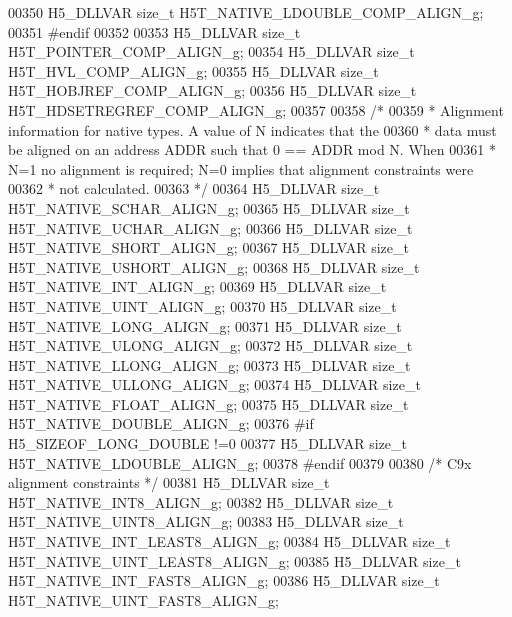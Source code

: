 \begin{DoxyCode}
00350 H5\_DLLVAR \textcolor{keywordtype}{size\_t}    H5T\_NATIVE\_LDOUBLE\_COMP\_ALIGN\_g;
00351 \textcolor{preprocessor}{#endif}
00352 
00353 H5\_DLLVAR \textcolor{keywordtype}{size\_t} H5T\_POINTER\_COMP\_ALIGN\_g;
00354 H5\_DLLVAR \textcolor{keywordtype}{size\_t} H5T\_HVL\_COMP\_ALIGN\_g;
00355 H5\_DLLVAR \textcolor{keywordtype}{size\_t} H5T\_HOBJREF\_COMP\_ALIGN\_g;
00356 H5\_DLLVAR \textcolor{keywordtype}{size\_t} H5T\_HDSETREGREF\_COMP\_ALIGN\_g;
00357 
00358 \textcolor{comment}{/*}
00359 \textcolor{comment}{ * Alignment information for native types. A value of N indicates that the}
00360 \textcolor{comment}{ * data must be aligned on an address ADDR such that 0 == ADDR mod N. When}
00361 \textcolor{comment}{ * N=1 no alignment is required; N=0 implies that alignment constraints were}
00362 \textcolor{comment}{ * not calculated.}
00363 \textcolor{comment}{ */}
00364 H5\_DLLVAR \textcolor{keywordtype}{size\_t}    H5T\_NATIVE\_SCHAR\_ALIGN\_g;
00365 H5\_DLLVAR \textcolor{keywordtype}{size\_t}    H5T\_NATIVE\_UCHAR\_ALIGN\_g;
00366 H5\_DLLVAR \textcolor{keywordtype}{size\_t}    H5T\_NATIVE\_SHORT\_ALIGN\_g;
00367 H5\_DLLVAR \textcolor{keywordtype}{size\_t}    H5T\_NATIVE\_USHORT\_ALIGN\_g;
00368 H5\_DLLVAR \textcolor{keywordtype}{size\_t}    H5T\_NATIVE\_INT\_ALIGN\_g;
00369 H5\_DLLVAR \textcolor{keywordtype}{size\_t}    H5T\_NATIVE\_UINT\_ALIGN\_g;
00370 H5\_DLLVAR \textcolor{keywordtype}{size\_t}    H5T\_NATIVE\_LONG\_ALIGN\_g;
00371 H5\_DLLVAR \textcolor{keywordtype}{size\_t}    H5T\_NATIVE\_ULONG\_ALIGN\_g;
00372 H5\_DLLVAR \textcolor{keywordtype}{size\_t}    H5T\_NATIVE\_LLONG\_ALIGN\_g;
00373 H5\_DLLVAR \textcolor{keywordtype}{size\_t}    H5T\_NATIVE\_ULLONG\_ALIGN\_g;
00374 H5\_DLLVAR \textcolor{keywordtype}{size\_t}    H5T\_NATIVE\_FLOAT\_ALIGN\_g;
00375 H5\_DLLVAR \textcolor{keywordtype}{size\_t}    H5T\_NATIVE\_DOUBLE\_ALIGN\_g;
00376 \textcolor{preprocessor}{#if H5\_SIZEOF\_LONG\_DOUBLE !=0}
00377 H5\_DLLVAR \textcolor{keywordtype}{size\_t}    H5T\_NATIVE\_LDOUBLE\_ALIGN\_g;
00378 \textcolor{preprocessor}{#endif}
00379 
00380 \textcolor{comment}{/* C9x alignment constraints */}
00381 H5\_DLLVAR \textcolor{keywordtype}{size\_t}    H5T\_NATIVE\_INT8\_ALIGN\_g;
00382 H5\_DLLVAR \textcolor{keywordtype}{size\_t}    H5T\_NATIVE\_UINT8\_ALIGN\_g;
00383 H5\_DLLVAR \textcolor{keywordtype}{size\_t}    H5T\_NATIVE\_INT\_LEAST8\_ALIGN\_g;
00384 H5\_DLLVAR \textcolor{keywordtype}{size\_t}    H5T\_NATIVE\_UINT\_LEAST8\_ALIGN\_g;
00385 H5\_DLLVAR \textcolor{keywordtype}{size\_t}    H5T\_NATIVE\_INT\_FAST8\_ALIGN\_g;
00386 H5\_DLLVAR \textcolor{keywordtype}{size\_t}    H5T\_NATIVE\_UINT\_FAST8\_ALIGN\_g;

\end{DoxyCode}
